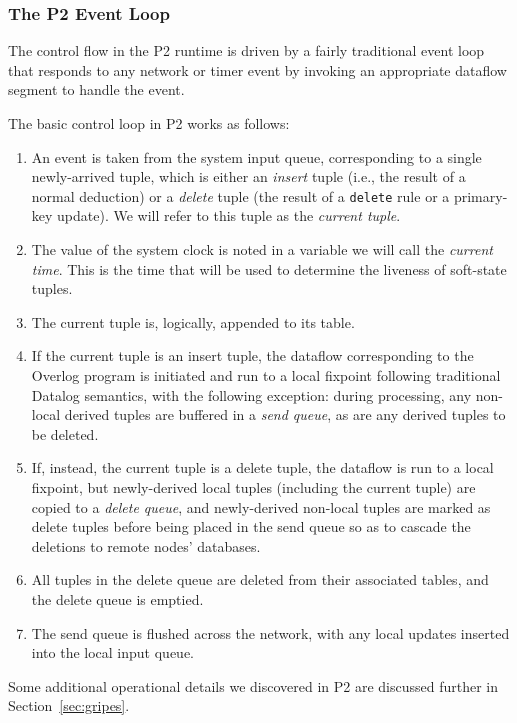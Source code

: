 \documentclass{sigmod08}
\newcommand{\ol}[1]{\texttt{\small #1}\xspace}
\def\compactify{\itemsep=0pt \topsep=0pt \partopsep=0pt \parsep=0pt}
\let\latexusecounter=\usecounter
\newenvironment{CompactEnumerate}
   {\def\usecounter{\compactify\latexusecounter}
    \begin{enumerate}}
   {\end{enumerate}\let\usecounter=\latexusecounter}
\begin{document}
\subsubsection{The P2 Event Loop}
\label{sec:eventloop}
The control flow in the P2 runtime is driven by a fairly traditional event loop that responds to any network or timer event by invoking an appropriate dataflow segment to handle the event.

The basic control loop in P2 works as follows:
\begin{CompactEnumerate}
    \item An event is taken from the system input queue, corresponding to a single newly-arrived tuple, which is either an {\em insert} tuple (i.e., the result of a normal deduction) or a {\em delete} tuple (the result of a \ol{delete} rule or a primary-key update).  We will refer to this tuple as the {\em current tuple}.
    \item The value of the system clock is noted in a variable we will call the {\em current time}.  This is the time that will be used to determine the liveness of soft-state tuples.  
    \item The current tuple is, logically, appended to its table.
    \item If the current tuple is an insert tuple, the dataflow corresponding to the Overlog program is initiated and run to a local fixpoint following traditional Datalog semantics, with the following exception: during processing, any non-local derived tuples are buffered in a {\em send queue}, as are any derived tuples to be deleted.
    \item If, instead, the current tuple is a delete tuple, the dataflow
    is run to a local fixpoint, but newly-derived local tuples
    (including the current tuple) are copied to a {\em delete queue},
    and newly-derived non-local tuples are marked as delete tuples
    before being placed in the send queue so as to cascade the deletions
    to remote nodes' databases.
    \item All tuples in the delete queue are deleted from their associated tables, and the delete queue is emptied.
    \item The send queue is flushed across the network, with any local updates inserted into the local input queue.
\end{CompactEnumerate}
Some additional operational details we discovered in P2 are discussed
further in Section~\ref{sec:gripes}.
\end{document}

